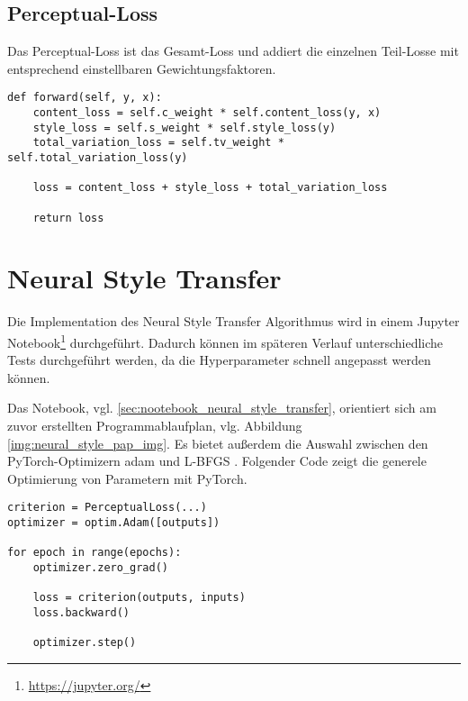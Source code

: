 \subsection{Perceptual-Loss}

Das Perceptual-Loss ist das Gesamt-Loss und addiert die einzelnen Teil-Losse mit entsprechend einstellbaren Gewichtungsfaktoren.

\begin{listing}[H]
\begin{verbatim}
def forward(self, y, x):
    content_loss = self.c_weight * self.content_loss(y, x)
    style_loss = self.s_weight * self.style_loss(y)
    total_variation_loss = self.tv_weight * self.total_variation_loss(y)

    loss = content_loss + style_loss + total_variation_loss

    return loss
\end{verbatim}
\end{listing}

\section{Neural Style Transfer}

Die Implementation des Neural Style Transfer Algorithmus wird in einem Jupyter Notebook\footnote{\url{https://jupyter.org/}} durchgeführt. 
Dadurch können im späteren Verlauf unterschiedliche Tests durchgeführt werden, da die Hyperparameter schnell angepasst werden können.

Das Notebook, vgl. \ref{sec:nootebook_neural_style_transfer}, orientiert sich am zuvor erstellten Programmablaufplan, vlg. Abbildung \ref{img:neural_style_pap_img}. Es bietet außerdem die Auswahl zwischen den PyTorch-Optimizern \gls{adam} und L-BFGS \cite{Liu1989}. Folgender Code zeigt die  generele Optimierung von Parametern mit PyTorch.

\begin{listing}[H]
\begin{verbatim}
criterion = PerceptualLoss(...)
optimizer = optim.Adam([outputs])

for epoch in range(epochs):
    optimizer.zero_grad()

    loss = criterion(outputs, inputs)
    loss.backward()

    optimizer.step()    
\end{verbatim}
\end{listing}

